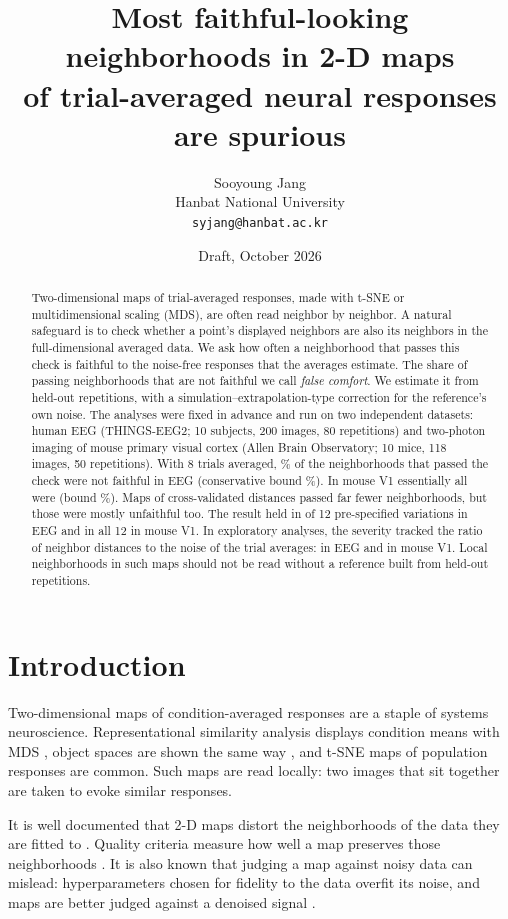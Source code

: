 \documentclass[11pt]{article}
\title{Most faithful-looking neighborhoods in 2-D maps\\ of trial-averaged neural responses are spurious}
\author{Sooyoung Jang\\[2pt] \small Hanbat National University\\ \small\texttt{syjang@hanbat.ac.kr}}
\date{Draft, October 2026}
\begin{document}
\maketitle

\begin{abstract}
Two-dimensional maps of trial-averaged responses, made with t-SNE or multidimensional scaling
(MDS), are often read neighbor by neighbor. A natural safeguard is to check whether a point's
displayed neighbors are also its neighbors in the full-dimensional averaged data. We ask how
often a neighborhood that passes this check is faithful to the noise-free responses that the
averages estimate. The share of passing neighborhoods that are not faithful we call
\emph{false comfort}. We estimate it from held-out repetitions, with a
simulation--extrapolation-type correction for the reference's own noise. The analyses were
fixed in advance and run on two independent datasets: human EEG (THINGS-EEG2; 10 subjects,
200 images, 80 repetitions) and two-photon imaging of mouse primary visual cortex (Allen Brain
Observatory; 10 mice, 118 images, 50 repetitions). With 8 trials averaged, \EegFCeight\% of
the neighborhoods that passed the check were not faithful in EEG (conservative bound
\EegLeight\%). In mouse V1 essentially all were (bound \MouseLeight\%). Maps of
cross-validated distances passed far fewer neighborhoods, but those were mostly unfaithful
too. The result held in \EegCells{} of 12 pre-specified variations in EEG and in all 12 in
mouse V1. In
exploratory analyses, the severity tracked the ratio of neighbor distances to the noise of the
trial averages: \RatioEeg{} in EEG and \RatioMouse{} in mouse V1. Local neighborhoods in such
maps should not be read without a reference built from held-out repetitions.
\end{abstract}

\section{Introduction}

Two-dimensional maps of condition-averaged responses are a staple of systems neuroscience.
Representational similarity analysis displays condition means with MDS
\citep{kriegeskorte2008,nili2014}, object spaces are shown the same way \citep{hebart2023}, and
t-SNE \citep{vandermaaten2008} maps of population responses are common. Such maps are read
locally: two images that sit together are taken to evoke similar responses.

It is well documented that 2-D maps distort the neighborhoods of the data they are fitted to
\citep{chari2023,cooley2019,lause2024}. Quality criteria measure how well a map preserves those
neighborhoods \citep{lee2009,venna2010}. It is also known that judging a map against noisy data
can mislead: hyperparameters chosen for fidelity to the data overfit its noise, and maps are
better judged against a denoised signal \citep{lin2024}.
\end{document}
